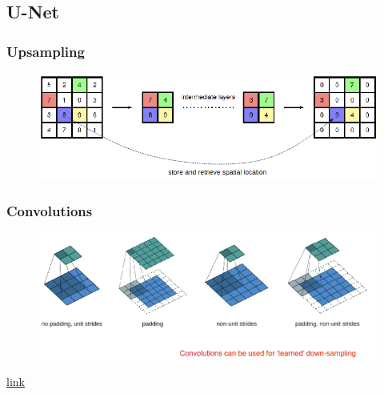 \documentclass[11pt]{article}
\begin{document}
\subsection{U-Net}

\begin{figure}[H]
    \centering
\end{figure}

\subsubsection{Upsampling}\label{sect:upsample}

\begin{figure}[H]
    \centering
    \includegraphics[width=.8\linewidth]{figures/upsampling.png}
\end{figure}

\subsubsection{Convolutions}

\begin{figure}[H]
    \centering
    \includegraphics[width=.8\linewidth]{figures/convolutions.png}
\end{figure}

\href{https://github.com/vdumoulin/conv_arithmetic}{link}
\end{document}
